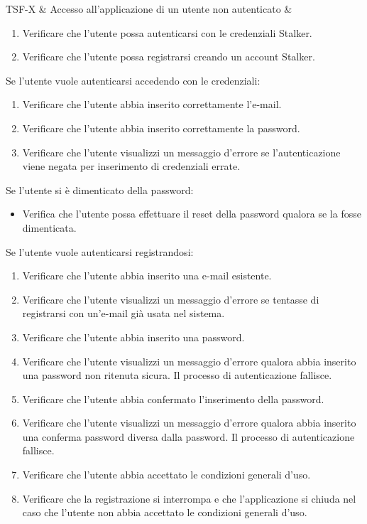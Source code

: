 

TSF-X & Accesso all'applicazione di un utente non autenticato & \begin{enumerate}
    \item Verificare che l'utente possa autenticarsi con le credenziali Stalker.
    \item Verificare che l'utente possa registrarsi creando un account Stalker.
\end{enumerate}
Se l'utente vuole autenticarsi accedendo con le credenziali:
\begin{enumerate}
    \item Verificare che l'utente abbia inserito correttamente l'e-mail.
    \item Verificare che l'utente abbia inserito correttamente la password.
    \item Verificare che l'utente visualizzi un messaggio d'errore se l'autenticazione viene negata per inserimento di credenziali errate.
\end{enumerate}
Se l'utente si è dimenticato della password:
\begin{itemize}
    \item Verifica che l'utente possa effettuare il reset della password qualora se la fosse dimenticata.
\end{itemize}
Se l'utente vuole autenticarsi registrandosi:
\begin{enumerate}
    \item Verificare che l'utente abbia inserito una e-mail esistente.
    \item Verificare che l'utente visualizzi un messaggio d'errore se tentasse di registrarsi con un'e-mail già usata nel sistema.
    \item Verificare che l'utente abbia inserito una password.
    \item Verificare che l'utente visualizzi un messaggio d'errore qualora abbia inserito una password non ritenuta sicura. Il processo di autenticazione fallisce.
    \item Verificare che l'utente abbia confermato l'inserimento della password.
    \item Verificare che l'utente visualizzi un messaggio d'errore qualora abbia inserito una conferma password diversa dalla password. Il processo di autenticazione fallisce.
    \item Verificare che l'utente abbia accettato le condizioni generali d'uso.
    \item Verificare che la registrazione si interrompa e che l'applicazione si chiuda nel caso che l'utente non abbia accettato le condizioni generali d'uso.
\end{enumerate} \\

